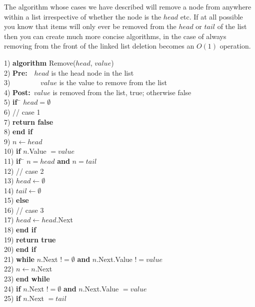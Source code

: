 The algorithm whose cases we have described will remove a node from anywhere within a list irrespective of whether the node is the $head$ etc. If at all possible you know that items will only ever be removed from the $head$ or $tail$ of the list then you can create much more concise algorithms, in the case of always removing  from the front of the linked list deletion becomes an $O(1)$ operation.

\newpage
\begin{tabbing}
1)  \textbf{alg}\= \textbf{orithm} Remove($head$, $value$) \\
2)  \> \textbf{Pre:}~~$head$ is the head node in the list \\
3)  \> ~~~~~~~~$value$ is the value to remove from the list \\
4)  \> \textbf{Post:}~$value$ is removed from the list, true; otherwise false \\
5)  \> \textbf{if}~\= $head = \emptyset$ \\
6)  \> \> // case 1 \\
7)  \> \> \textbf{return false} \\
8)  \> \textbf{end if} \\
9)  \> $n \leftarrow head$ \\
10) \> \textbf{if} $n$.Value $= value$ \\
11) \> \> \textbf{if}~\= $n = head$ \textbf{and} $n = tail$ \\
12) \> \> \> // case 2 \\
13) \> \> \> $head \leftarrow \emptyset$ \\
14) \> \> \> $tail \leftarrow \emptyset$ \\
15) \> \> \textbf{else} \\
16) \> \> \> // case 3 \\
17) \> \> \> $head \leftarrow head$.Next \\
18) \> \> \textbf{end if} \\
19) \> \> \textbf{return true} \\
20) \> \textbf{end if} \\
21) \> \textbf{while} $n$.Next $!= \emptyset$ \textbf{and} $n$.Next.Value $!= value$ \\
22) \> \> $n \leftarrow n$.Next \\
23) \> \textbf{end while} \\
24) \> \textbf{if} $n$.Next $!= \emptyset$ \textbf{and} $n$.Next.Value $= value$ \\
25) \> \> \textbf{if} $n$.Next $= tail$ \\

\end{tabbing}

